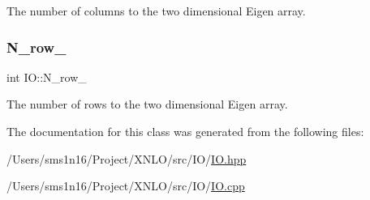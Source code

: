 The number of columns to the two dimensional Eigen array. \mbox{\label{class_i_o_ab8aa1490df2e2e758766030afdae3a40}} 
\subsubsection{\texorpdfstring{N\+\_\+row\+\_\+}{N\_row\_}}
{\footnotesize\ttfamily int I\+O\+::\+N\+\_\+row\+\_\+}

The number of rows to the two dimensional Eigen array. 

The documentation for this class was generated from the following files\+:\begin{DoxyCompactItemize}
\item 
/\+Users/sms1n16/\+Project/\+X\+N\+L\+O/src/\+I\+O/\hyperlink{_i_o_8hpp}{I\+O.\+hpp}\item 
/\+Users/sms1n16/\+Project/\+X\+N\+L\+O/src/\+I\+O/\hyperlink{_i_o_8cpp}{I\+O.\+cpp}\end{DoxyCompactItemize}
